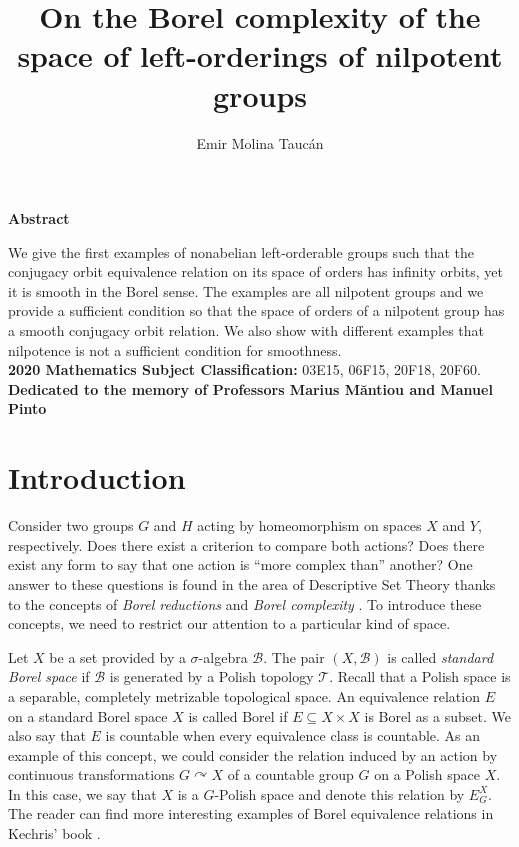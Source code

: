 \documentclass[12pt]{article}
\title{On the Borel complexity of the space of left-orderings of nilpotent groups}
\date{}
\author{Emir Molina Taucán}
\theoremstyle{definition}
\begin{document}
\maketitle

\begin{center}
{\bf Abstract}
\end{center}
\noindent We give the first examples of nonabelian left-orderable groups such that the conjugacy orbit equivalence relation on its space of orders has infinity orbits, yet it is smooth in the Borel sense.  
The examples are all nilpotent groups and we provide a sufficient condition so that the space of orders of a nilpotent group has a smooth conjugacy orbit relation.
We also show with different examples that nilpotence is not a sufficient condition for smoothness.\\


\noindent\textbf{2020 Mathematics Subject Classification:} 03E15, 06F15, 20F18, 20F60. \\

\textbf{\centering Dedicated to the memory of Professors Marius M\u antiou and Manuel Pinto}

\section{Introduction}

Consider two groups $G$ and $H$ acting by homeomorphism on spaces $X$ and $Y$, respectively. Does there exist a criterion to compare both actions? Does there exist any form to say that one action is ``more complex than'' another? One answer to these questions is found in the area of Descriptive Set Theory %
thanks to the concepts of \textit{Borel reductions} and \textit{Borel complexity} \cite{Kanovei,Gao}.
To introduce these concepts, we need to restrict our attention to a particular kind of space.

Let $X$ be a set provided by a $\sigma$-algebra $\mathcal{B}$. The pair $(X,\mathcal{B})$ is called \textit{standard Borel space} if $\mathcal{B}$ is generated by a Polish topology $\mathcal{T}$. Recall that a Polish space is a separable, completely metrizable topological space. 
An equivalence relation $E$ on a standard Borel space $X$ is called Borel if $E\subseteq X\times X$ is Borel as a subset. 
We also say that $E$ is countable when every equivalence class is countable.
As an example of this concept, we could consider the relation induced by an action by continuous transformations $G\curvearrowright X$ of a countable group $G$ on a Polish space $X$.
In this case, we say that $X$ is a $G$-Polish space and denote this relation by $E_{G}^X$. 
The reader can find more interesting examples of Borel equivalence relations in Kechris' book \cite{NKechris}.
\end{document}

